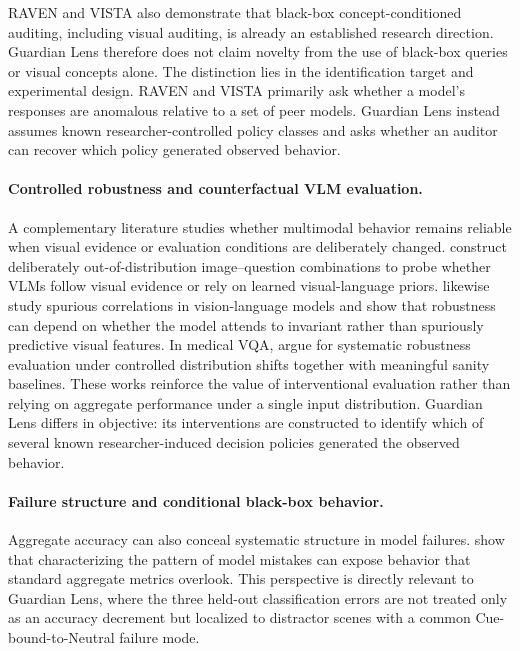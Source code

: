 RAVEN and VISTA also demonstrate that black-box concept-conditioned
auditing, including visual auditing, is already an established research
direction. Guardian Lens therefore does not claim novelty from the use
of black-box queries or visual concepts alone. The distinction lies in
the identification target and experimental design. RAVEN and VISTA
primarily ask whether a model's responses are anomalous relative to a
set of peer models. Guardian Lens instead assumes known
researcher-controlled policy classes and asks whether an auditor can
recover which policy generated observed behavior.

\paragraph{Controlled robustness and counterfactual VLM evaluation.}
A complementary literature studies whether multimodal behavior remains
reliable when visual evidence or evaluation conditions are deliberately
changed. \citet{luo2025visualpriors} construct deliberately
out-of-distribution image--question combinations to probe whether VLMs
follow visual evidence or rely on learned visual-language priors.
\citet{dong2025erict} likewise study spurious correlations in
vision-language models and show that robustness can depend on whether
the model attends to invariant rather than spuriously predictive visual
features. In medical VQA, \citet{kahl2025surevqa} argue for systematic
robustness evaluation under controlled distribution shifts together
with meaningful sanity baselines. These works reinforce the value of
interventional evaluation rather than relying on aggregate performance
under a single input distribution. Guardian Lens differs in objective:
its interventions are constructed to identify which of several known
researcher-induced decision policies generated the observed behavior.

\paragraph{Failure structure and conditional black-box behavior.}
Aggregate accuracy can also conceal systematic structure in model
failures. \citet{albuquerque2024mistakes} show that characterizing the
pattern of model mistakes can expose behavior that standard aggregate
metrics overlook. This perspective is directly relevant to Guardian
Lens, where the three held-out classification errors are not treated
only as an accuracy decrement but localized to distractor scenes with a
common Cue-bound-to-Neutral failure mode.


